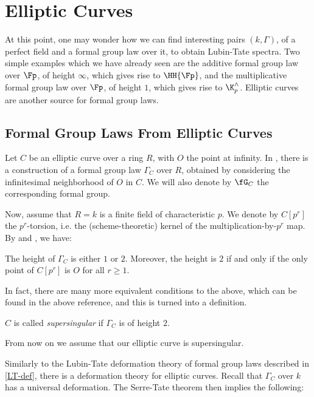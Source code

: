 \section{Elliptic Curves}\label{sec:ell}

At this point, one may wonder how we can find interesting pairs $\left(k, \Gamma\right)$, of a perfect field and a formal group law over it, to obtain Lubin-Tate spectra.
Two simple examples which we have already seen are the additive formal group law over $\Fp$, of height $\infty$, which gives rise to $\HH{\Fp}$, and the multiplicative formal group law over $\Fp$, of height $1$, which gives rise to $\K_p^\wedge$.
Elliptic curves are another source for formal group laws.



\subsection{Formal Group Laws From Elliptic Curves}

Let $C$ be an elliptic curve over a ring $R$, with $O$ the point at infinity.
In \cite[IV]{Sil}, there is a construction of a formal group law $\Gamma_C$ over $R$, obtained by considering the infinitesimal neighborhood of $O$ in $C$.
We will also denote by $\fG_C$ the corresponding formal group.

Now, assume that $R = k$ is a finite field of characteristic $p$.
We denote by $C\left[p^r\right]$ the $p^r$-torsion, i.e. the (scheme-theoretic) kernel of the multiplication-by-$p^r$ map.
By \cite[IV.7.5]{Sil} and \cite[V.3.1]{Sil}, we have:

\begin{proposition}\label{height-torsion}
	The height of $\Gamma_C$ is either $1$ or $2$.
	Moreover, the height is $2$ if and only if the only point of $C\left[p^r\right]$ is $O$ for all $r \geq 1$.
\end{proposition}

In fact, there are many more equivalent conditions to the above, which can be found in the above reference, and this is turned into a definition.

\begin{definition}
	$C$ is called \emph{supersingular} if $\Gamma_C$ is of height $2$.
\end{definition}

From now on we assume that our elliptic curve is supersingular.

Similarly to the Lubin-Tate deformation theory of formal group laws described in \cref{LT-def}, there is a deformation theory for elliptic curves.
Recall that $\Gamma_C$ over $k$ has a universal deformation.
The Serre-Tate theorem \cite[2.9.1]{KM} then implies the following:

